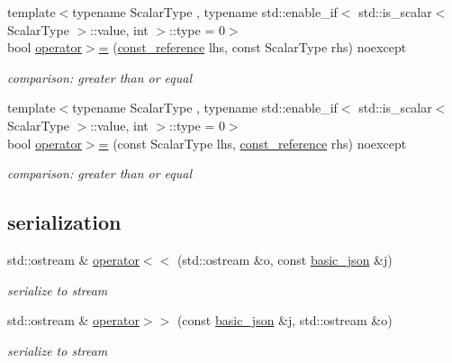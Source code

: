 \begin{DoxyCompactItemize}
{\footnotesize template$<$typename Scalar\+Type , typename std\+::enable\+\_\+if$<$ std\+::is\+\_\+scalar$<$ Scalar\+Type $>$\+::value, int $>$\+::type  = 0$>$ }\\bool \mbox{\hyperlink{classnlohmann_1_1basic__json_a68e3a92b3d9be1faa05c92d096299189}{operator$>$=}} (\mbox{\hyperlink{classnlohmann_1_1basic__json_a4057c5425f4faacfe39a8046871786ca}{const\+\_\+reference}} lhs, const Scalar\+Type rhs) noexcept
\begin{DoxyCompactList}\small\item\em comparison\+: greater than or equal \end{DoxyCompactList}\item 
{\footnotesize template$<$typename Scalar\+Type , typename std\+::enable\+\_\+if$<$ std\+::is\+\_\+scalar$<$ Scalar\+Type $>$\+::value, int $>$\+::type  = 0$>$ }\\bool \mbox{\hyperlink{classnlohmann_1_1basic__json_a5ee0e3e8afc7cbd932d6ed66418fa80a}{operator$>$=}} (const Scalar\+Type lhs, \mbox{\hyperlink{classnlohmann_1_1basic__json_a4057c5425f4faacfe39a8046871786ca}{const\+\_\+reference}} rhs) noexcept
\begin{DoxyCompactList}\small\item\em comparison\+: greater than or equal \end{DoxyCompactList}\end{DoxyCompactItemize}
\subsection*{serialization}
\begin{DoxyCompactItemize}
\item 
std\+::ostream \& \mbox{\hyperlink{classnlohmann_1_1basic__json_a5e34c5435e557d0bf666bd7311211405}{operator$<$$<$}} (std\+::ostream \&o, const \mbox{\hyperlink{classnlohmann_1_1basic__json}{basic\+\_\+json}} \&j)
\begin{DoxyCompactList}\small\item\em serialize to stream \end{DoxyCompactList}\item 
std\+::ostream \& \mbox{\hyperlink{classnlohmann_1_1basic__json_a34d6a60dd99e9f33b8273a1c8db5669b}{operator$>$$>$}} (const \mbox{\hyperlink{classnlohmann_1_1basic__json}{basic\+\_\+json}} \&j, std\+::ostream \&o)
\begin{DoxyCompactList}\small\item\em serialize to stream \end{DoxyCompactList}\end{DoxyCompactItemize}
